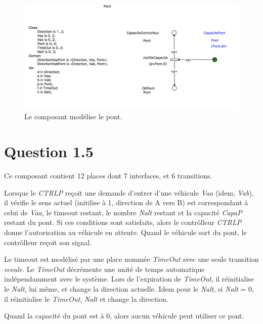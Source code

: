 \documentclass[a4paper,11pt]{report}
\begin{document}
	\begin{figure}[!htbp]
		\centering
		\includegraphics[width = 15cm]{pontModel.png}
		\caption{Le composant modélise le pont.}
	\end{figure}
	\newpage
	
\section{Question 1.5}
	Ce composant contient 12 places dont 7 interfaces, et 6 transitions.
	
	Lorsque le \textit{CTRLP} reçoit une demande d'entrer d'une véhicule \textit{Vaa} (idem, \textit{Vab}), il vérifie le sens actuel (initilise à 1, direction de A vers B) est correspondant à celui de \textit{Vaa}, le timeout restant, le nombre \textit{Nalt} restant et la capacité \textit{CapaP} restant du pont. Si ces conditions sont satisfaits, alors le contrôlleur \textit{CTRLP} donne l'autorisation au véhicule en attente. Quand le véhicule sort du pont, le contrôlleur reçoit son signal. 
	
	Le timeout est modélisé par une place nommée \textit{TimeOut} avec une seule transition \textit{ecoule}. Le \textit{TimeOut} décrémente une unité de temps automatique indépendamment avec le système. Lors de l'expiration de \textit{TimeOut}, il réinitialise le \textit{Nalt}, lui même, et change la direction actuelle.  Idem pour le \textit{Nalt}, si \textit{Nalt} = 0, il réinitialise le \textit{TimeOut}, \textit{Nalt} et change la direction.
	
	Quand la capacité du pont est à 0, alors aucun véhicule peut utiliser ce pont.
\end{document}
